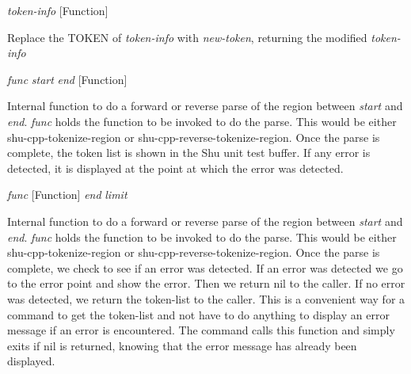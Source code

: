 \vspace{1em}
\noindent
{}
\usebox{\funcname}\emph{token-info}
 \hfill [Function]
\hspace*{\wd\funcname}

\begin{doc-string}
Replace the TOKEN of \emph{token-info} with \emph{new-token}, returning the
modified \emph{token-info}
\end{doc-string}

\vspace{1em}
\noindent
{}
\usebox{\funcname}\emph{func} \emph{start} \emph{end}
 \hfill [Function]

\begin{doc-string}
Internal function to do a forward or reverse parse of the region between \emph{start}
and \emph{end}.  \emph{func} holds the function to be invoked to do the parse.  This would be
either shu-cpp-tokenize-region or shu-cpp-reverse-tokenize-region.  Once the
parse is complete, the token list is shown in the Shu unit test buffer.  If any
error is detected, it is displayed at the point at which the error was
detected.
\end{doc-string}

\vspace{1em}
\noindent
{}
\usebox{\funcname}\emph{func}
 \hfill [Function]
\hspace*{\wd\funcname}\emph{end}
\hspace*{\wd\funcname}\emph{limit}

\begin{doc-string}
Internal function to do a forward or reverse parse of the region between \emph{start}
and \emph{end}.  \emph{func} holds the function to be invoked to do the parse.  This would be
either shu-cpp-tokenize-region or shu-cpp-reverse-tokenize-region.  Once the
parse is complete, we check to see if an error was detected.  If an error was
detected we go to the error point and show the error.  Then we return nil to the
caller.  If no error was detected, we return the token-list to the caller.  This
is a convenient way for a command to get the token-list and not have to do anything
to display an error message if an error is encountered.  The command calls this
function and simply exits if nil is returned, knowing that the error message has
already been displayed.
\end{doc-string}

